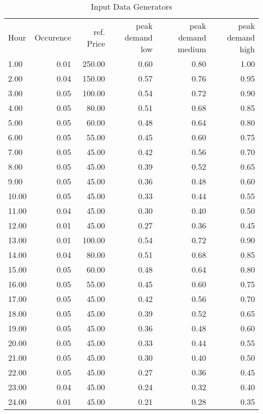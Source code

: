 \documentclass[landscape]{article}
\begin{document}
\begin{table}[htb]\caption{Input Data Generators}
\begin{tabular}{lrrrrr}
\toprule
Hour & Occurence & ref. Price & peak demand low & peak demand medium & peak demand high \\
        1.00&        0.01&      250.00&        0.60&        0.80&        1.00\\
        2.00&        0.04&      150.00&        0.57&        0.76&        0.95\\
        3.00&        0.05&      100.00&        0.54&        0.72&        0.90\\
        4.00&        0.05&       80.00&        0.51&        0.68&        0.85\\
        5.00&        0.05&       60.00&        0.48&        0.64&        0.80\\
        6.00&        0.05&       55.00&        0.45&        0.60&        0.75\\
        7.00&        0.05&       45.00&        0.42&        0.56&        0.70\\
        8.00&        0.05&       45.00&        0.39&        0.52&        0.65\\
        9.00&        0.05&       45.00&        0.36&        0.48&        0.60\\
       10.00&        0.05&       45.00&        0.33&        0.44&        0.55\\
       11.00&        0.04&       45.00&        0.30&        0.40&        0.50\\
       12.00&        0.01&       45.00&        0.27&        0.36&        0.45\\
       13.00&        0.01&      100.00&        0.54&        0.72&        0.90\\
       14.00&        0.04&       80.00&        0.51&        0.68&        0.85\\
       15.00&        0.05&       60.00&        0.48&        0.64&        0.80\\
       16.00&        0.05&       55.00&        0.45&        0.60&        0.75\\
       17.00&        0.05&       45.00&        0.42&        0.56&        0.70\\
       18.00&        0.05&       45.00&        0.39&        0.52&        0.65\\
       19.00&        0.05&       45.00&        0.36&        0.48&        0.60\\
       20.00&        0.05&       45.00&        0.33&        0.44&        0.55\\
       21.00&        0.05&       45.00&        0.30&        0.40&        0.50\\
       22.00&        0.05&       45.00&        0.27&        0.36&        0.45\\
       23.00&        0.04&       45.00&        0.24&        0.32&        0.40\\
       24.00&        0.01&       45.00&        0.21&        0.28&        0.35\\
\bottomrule
\end{tabular}
\end{table}
\end{document}
